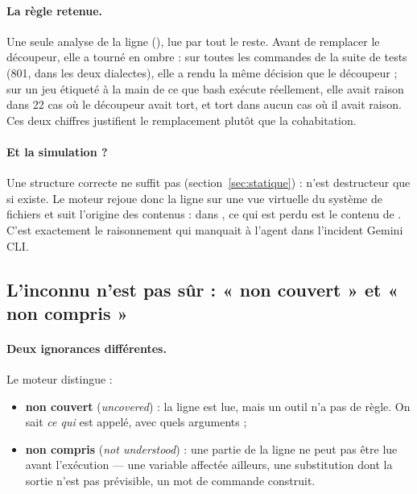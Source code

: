 \paragraph{La règle retenue.} Une seule analyse de la ligne (), lue par
tout le reste. Avant de remplacer le découpeur, elle a tourné en ombre : sur toutes les
commandes de la suite de tests (801, dans les deux dialectes), elle a rendu la même décision
que le découpeur ; sur un jeu étiqueté à la main de ce que bash exécute réellement, elle
avait raison dans 22 cas où le découpeur avait tort, et tort dans aucun cas où il avait
raison. Ces deux chiffres justifient le remplacement plutôt que la cohabitation.

\paragraph{Et la simulation ?} Une structure correcte ne suffit pas
(section~\ref{sec:statique}) :  n'est destructeur que si 
existe. Le moteur rejoue donc la ligne sur une vue virtuelle du système de fichiers et suit
l'origine des contenus : dans , ce qui est perdu est le contenu de
. C'est exactement le raisonnement qui manquait à l'agent dans l'incident Gemini CLI.

\subsection{L'inconnu n'est pas sûr : « non couvert » et « non compris »}
\label{sec:inconnu}

\paragraph{Deux ignorances différentes.} Le moteur distingue :
\begin{itemize}
  \item \textbf{non couvert} (\textit{uncovered}) : la ligne est lue, mais un outil n'a pas
    de règle. On sait \emph{ce qui} est appelé, avec quels arguments ;
  \item \textbf{non compris} (\textit{not understood}) : une partie de la ligne ne peut pas
    être lue avant l'exécution --- une variable affectée ailleurs, une substitution dont la
    sortie n'est pas prévisible, un mot de commande construit.
\end{itemize}

